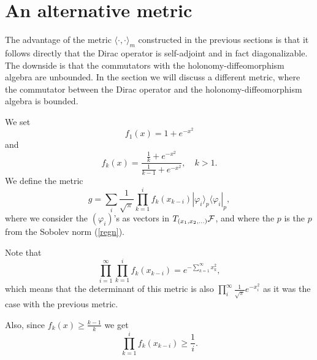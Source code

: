 \documentclass[letterpaper,11pt]{article}
\def\cf{{\cal F}}
\newcommand{\cF}{{\cal F}}
\begin{document}





















\section{An alternative metric}

The advantage of    the metric $\langle \cdot ,\cdot\rangle_m $  constructed in the previous sections  is that it follows directly that the Dirac operator is self-adjoint and in fact diagonalizable.  The downside is that the commutators with the holonomy-diffeomorphism algebra  are unbounded.  In the section we will discuss a different metric, where the commutator between the Dirac operator and the holonomy-diffeomorphism algebra is bounded. 

We set 
$$  f_1(x)=1+e^{-x^2}$$
and 
$$f_k (x)=\frac{\frac{1}{k}+e^{-x^2}}{\frac{1}{k-1}+e^{-x^2}} , \quad k>1 .$$
We define the metric
$$g=\sum_i  \frac{1}{\sqrt{\pi}}\prod_{k=1}^i f_k(x_{k-i}) |\varphi_i \rangle_p  \langle \varphi_i |_p ,$$
where we consider the $(\varphi_i)$'s as vectors in $T_{(x_1,x_2,\ldots )} \cF$, and where the $p$ is the $p$ from the Sobolev norm (\ref{regn}).

Note that 
$$ \prod_{i=1}^\infty  \prod_{k=1}^i f_k(x_{k-i}) =e^{-\sum_{k=1}^\infty x_k^2}, $$
which means that the determinant of this metric is also $\prod_i^\infty \frac{1}{\sqrt{\pi}}e^{-x_i^2}$ as it was the case with the previous metric.

Also, since $f_k (x)\geq \frac{k-1}{k} $ we get
 $$ \prod_{k=1}^i f_k(x_{k-i}) \geq \frac{1}{i} .$$
\end{document}
